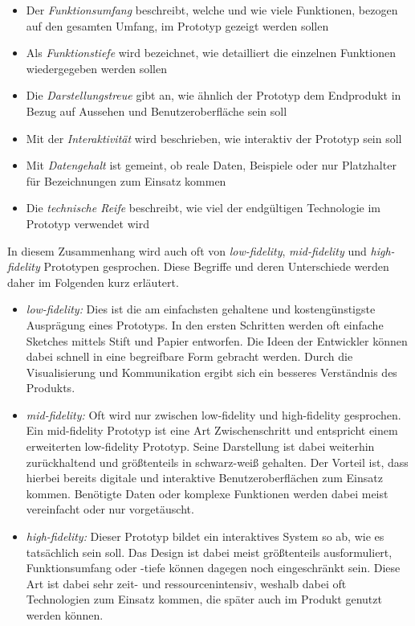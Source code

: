 \begin{itemize}
  \item Der \textit{Funktionsumfang} beschreibt, welche und wie viele Funktionen, bezogen auf den gesamten Umfang, im Prototyp gezeigt werden sollen
  
  \item Als \textit{Funktionstiefe} wird bezeichnet, wie detailliert die einzelnen Funktionen wiedergegeben werden sollen
  
  \item Die \textit{Darstellungstreue} gibt an, wie ähnlich der Prototyp dem Endprodukt in Bezug auf Aussehen und Benutzeroberfläche sein soll
  
  \item Mit der \textit{Interaktivität} wird beschrieben, wie interaktiv der Prototyp sein soll
  
  \item Mit \textit{Datengehalt} ist gemeint, ob reale Daten, Beispiele oder nur Platzhalter für Bezeichnungen zum Einsatz kommen
  
  \item Die \textit{technische Reife} beschreibt, wie viel der endgültigen Technologie im Prototyp verwendet wird
\end{itemize}

In diesem Zusammenhang wird auch oft von \textit{low-fidelity}, \textit{mid-fidelity} und \textit{high-fidelity} Prototypen gesprochen. Diese Begriffe und deren Unterschiede werden daher im Folgenden kurz erläutert.

\begin{itemize}
  \item \textit{low-fidelity:} Dies ist die am einfachsten gehaltene und kostengünstigste Ausprägung eines Prototyps. In den ersten Schritten werden oft einfache Sketches mittels Stift und Papier entworfen. Die Ideen der Entwickler können dabei schnell in eine begreifbare Form gebracht werden. Durch die Visualisierung und Kommunikation ergibt sich ein besseres Verständnis des Produkts.
  
  \item \textit{mid-fidelity:} Oft wird nur zwischen low-fidelity und high-fidelity gesprochen. Ein mid-fidelity Prototyp ist eine Art Zwischenschritt und entspricht einem erweiterten low-fidelity Prototyp. Seine Darstellung ist dabei weiterhin zurückhaltend und größtenteils in schwarz-weiß gehalten. Der Vorteil ist, dass hierbei bereits digitale und interaktive Benutzeroberflächen zum Einsatz kommen. Benötigte Daten oder komplexe Funktionen werden dabei meist vereinfacht oder nur vorgetäuscht.
  
  \item \textit{high-fidelity:} Dieser Prototyp bildet ein interaktives System so ab, wie es tatsächlich sein soll. Das Design ist dabei meist größtenteils ausformuliert, Funktionsumfang oder -tiefe können dagegen noch eingeschränkt sein. Diese Art ist dabei sehr zeit- und ressourcenintensiv, weshalb dabei oft Technologien zum Einsatz kommen, die später auch im Produkt genutzt werden können.
\end{itemize}

